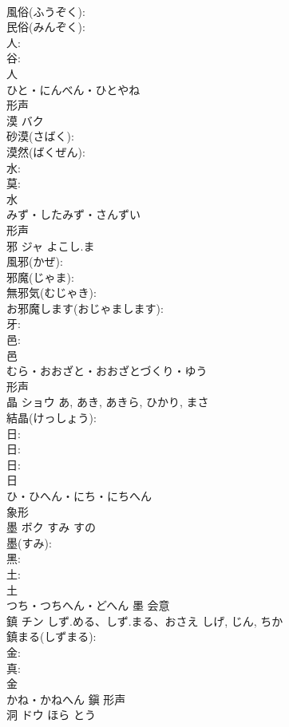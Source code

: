 \documentclass[8pt]{extreport}
\begin{document}
\begin{CJK}{UTF8}{min}
\\	風俗(ふうぞく): 
\\	民俗(みんぞく): 
\\	人: 
\\	谷: 
\\	人	
\\	ひと・にんべん・ひとやね	
\\	形声 
\\	漠	バク			
\\	砂漠(さばく): 
\\	漠然(ばくぜん): 
\\	水: 
\\	莫: 
\\	水	
\\	みず・したみず・さんずい	
\\	形声 
\\	邪	ジャ	よこし.ま		
\\	風邪(かぜ): 
\\	邪魔(じゃま): 
\\	無邪気(むじゃき): 
\\	お邪魔します(おじゃまします): 
\\	牙: 
\\	邑: 
\\	邑	
\\	むら・おおざと・おおざとづくり・ゆう	
\\	形声 
\\	晶	ショウ		あ, あき, あきら, ひかり, まさ	
\\	結晶(けっしょう): 
\\	日: 
\\	日: 
\\	日: 
\\	日	
\\	ひ・ひへん・にち・にちへん	
\\	象形 
\\	墨	ボク	すみ	すの	
\\	墨(すみ): 
\\	黑: 
\\	土: 
\\	土	
\\	つち・つちへん・どへん	墨	会意 
\\	鎮	チン	しず.める、しず.まる、おさえ	しげ, じん, ちか	
\\	鎮まる(しずまる): 
\\	金: 
\\	真: 
\\	金	
\\	かね・かねへん	鎭	形声 
\\	洞	ドウ	ほら	とう	

\end{CJK}
\end{document}
